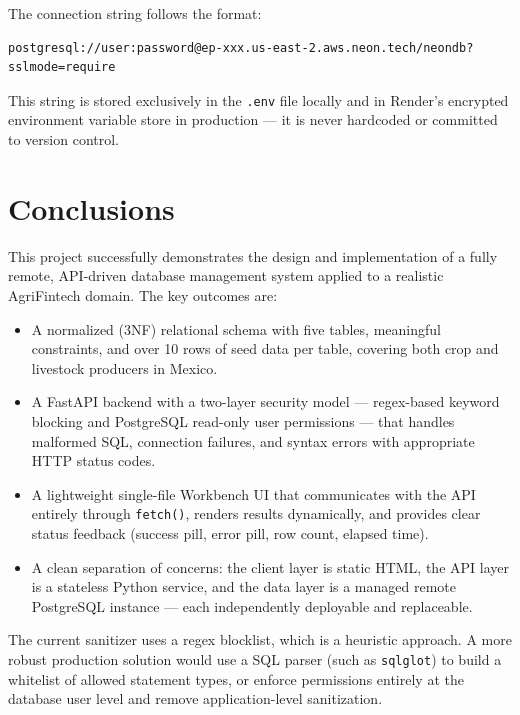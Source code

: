 \documentclass[12pt, a4paper]{article}
\begin{document}
The connection string follows the format:

\begin{lstlisting}[style=bashstyle]
postgresql://user:password@ep-xxx.us-east-2.aws.neon.tech/neondb?sslmode=require
\end{lstlisting}

This string is stored exclusively in the \texttt{.env} file locally and in Render's
encrypted environment variable store in production — it is never hardcoded or
committed to version control.

\section{Conclusions}

This project successfully demonstrates the design and implementation of a fully
remote, API-driven database management system applied to a realistic AgriFintech
domain. The key outcomes are:

\begin{itemize}[leftmargin=1.5em]
  \item A normalized (3NF) relational schema with five tables, meaningful constraints,
        and over 10 rows of seed data per table, covering both crop and livestock
        producers in Mexico.

  \item A FastAPI backend with a two-layer security model — regex-based keyword
        blocking and PostgreSQL read-only user permissions — that handles malformed
        SQL, connection failures, and syntax errors with appropriate HTTP status codes.

  \item A lightweight single-file Workbench UI that communicates with the API
        entirely through \texttt{fetch()}, renders results dynamically, and provides
        clear status feedback (success pill, error pill, row count, elapsed time).

  \item A clean separation of concerns: the client layer is static HTML, the API
        layer is a stateless Python service, and the data layer is a managed remote
        PostgreSQL instance — each independently deployable and replaceable.
\end{itemize}

\begin{warningbox}
  The current sanitizer uses a regex blocklist, which is a heuristic approach.
  A more robust production solution would use a SQL parser (such as \texttt{sqlglot})
  to build a whitelist of allowed statement types, or enforce permissions entirely at
  the database user level and remove application-level sanitization.
\end{warningbox}
\end{document}
